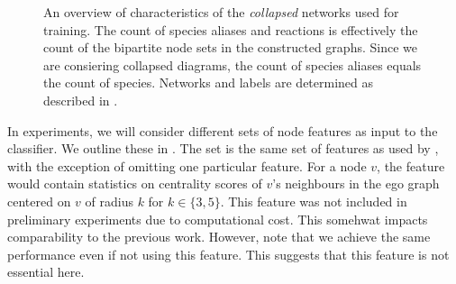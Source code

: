 \documentclass[
	fontsize=10pt, %
	twoside=false, %
	secnumdepth=1, %
  toc=indentunnumbered %
]{kaobook}
\begin{document}
\begin{figure}[h]
\begin{subfigure}{0.32\textwidth}
  \end{subfigure} 
  \caption[
  An overview of characteristics of networks used for training.
  ]{ An overview of characteristics of the \textit{collapsed} networks
    used for training. The count of species aliases and reactions is effectively
    the count of the bipartite node sets in the constructed graphs. Since we are
    consiering collapsed diagrams, the count of species aliases equals the count
    of species.
    Networks and labels are determined as described in
    . }
  \label{fig:maps-summary}
\end{figure}





In experiments, we will consider different sets of node features as input to the
classifier. We outline these  in 
. The set  is the same set of
features as used by \nielsen{}, with the exception of omitting one particular
feature. For a node $v$, the feature would contain statistics on centrality
scores of $v$'s neighbours in the ego graph centered on $v$ of radius $k$ for $k
\in \{3,5\}$. This feature was not included in preliminary experiments due to
computational cost. This somehwat impacts comparability to the previous work.
However, note that we achieve the same performance even if not using this
feature. This suggests that this feature is not essential here.
\end{document}
